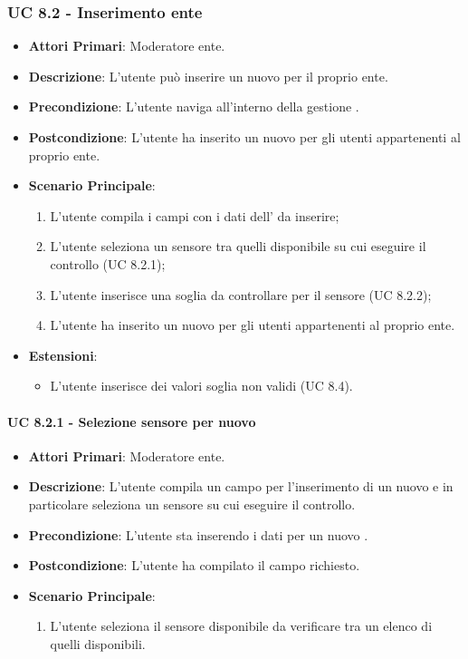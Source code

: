 			\subsubsection{UC 8.2 - Inserimento  ente}
			\begin{itemize}
				\item \textbf{Attori Primari}: Moderatore ente.
				\item \textbf{Descrizione}: L'utente può inserire un nuovo  per il proprio ente.
				\item \textbf{Precondizione}: L'utente naviga all'interno della gestione .
				\item \textbf{Postcondizione}: L'utente ha inserito un nuovo  per gli utenti appartenenti al proprio ente.
				\item \textbf{Scenario Principale}:
				\begin{enumerate}
					\item{L'utente compila i campi con i dati dell' da inserire;}
					\item L'utente seleziona un sensore tra quelli disponibile su cui eseguire il controllo (UC 8.2.1);
					\item L'utente inserisce una soglia da controllare per il sensore (UC 8.2.2);
					\item{L'utente ha inserito un nuovo  per gli utenti appartenenti al proprio ente.}
				\end{enumerate}
				\item \textbf{Estensioni}:
				\begin{itemize}
					\item L'utente inserisce dei valori soglia non validi (UC 8.4).
				\end{itemize}		
			\end{itemize}
			
				\paragraph{UC 8.2.1 - Selezione sensore per nuovo }
				\begin{itemize}
					\item \textbf{Attori Primari}: Moderatore ente.
					\item \textbf{Descrizione}: L'utente compila un campo per l'inserimento di un nuovo  e in particolare seleziona un sensore su cui eseguire il controllo.
					\item \textbf{Precondizione}: L'utente sta inserendo i dati per un nuovo .
					\item \textbf{Postcondizione}: L'utente ha compilato il campo richiesto.
					\item \textbf{Scenario Principale}:
					\begin{enumerate}
						\item{L'utente seleziona il sensore disponibile da verificare tra un elenco di quelli disponibili.}
					\end{enumerate}	
				\end{itemize}

